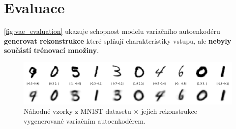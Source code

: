 \section{Evaluace}
\autoref{fig:vae_evaluation} ukazuje schopnost modelu variačního autoenkodéru \textbf{generovat rekonstrukce} které splňují charakteristiky vstupu, ale \textbf{nebyly součástí trénovací množiny}.
\begin{figure}[H]
    \centering
    \includegraphics[width=\textwidth]{figures/eval.png}
    \caption{Náhodné vzorky z MNIST datasetu $\times$ jejich rekonstrukce vygenerované variačním autoenkodérem.}
    \label{fig:vae_evaluation}
\end{figure}